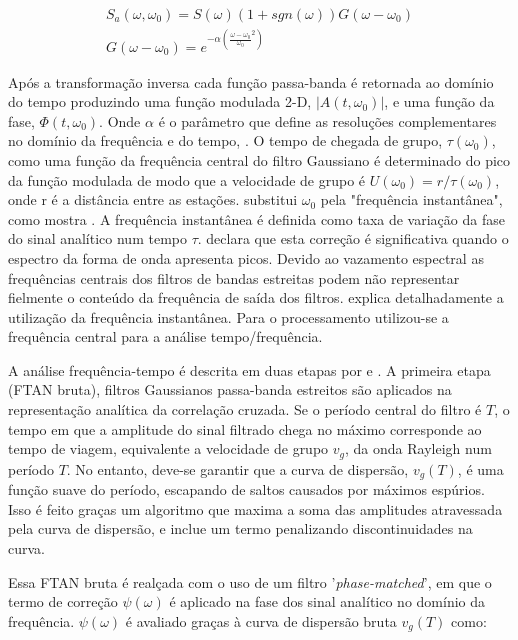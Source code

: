 \begin{eqnarray}
S_{a}(\omega,\omega _{0}) = S(\omega)(1 + sgn(\omega))G(\omega - \omega _{0})
\\
G(\omega - \omega _{0}) = e^{-\alpha(\frac{\omega - \omega _{0}}{\omega _{0}}^{2})}
\end{eqnarray}

Após a transformação inversa cada função passa-banda é retornada ao domínio do tempo produzindo uma função modulada 2-D, $\left | A(t,\omega _{0}) \right |$, e uma função da fase, $ \Phi(t,\omega _{0}) $. Onde $\alpha$ é o parâmetro que define as resoluções complementares no domínio da frequência e do tempo, \cite{levshin_automated_2001}. O tempo de chegada de grupo, $\tau (\omega _{0})$, como uma função da frequência central do filtro Gaussiano é determinado do pico da função modulada de modo que a velocidade de grupo é $U(\omega _{0})=r/\tau (\omega _{0})$, onde r é a distância entre as estações. \cite{bensen_processing_2007} substitui $\omega _{0}$ pela "frequência instantânea", como mostra \cite{bracewell_fourier_1978}. A frequência instantânea é definida como taxa de variação da fase do sinal analítico num tempo $\tau$. \cite{bensen_processing_2007} declara que esta correção é significativa quando o espectro da forma de onda apresenta picos. Devido ao vazamento espectral as frequências centrais dos filtros de bandas estreitas podem não representar fielmente o conteúdo da frequência de saída dos filtros. \cite{boashash_estimating_1992} explica detalhadamente a utilização da frequência instantânea. Para o processamento utilizou-se a frequência central para a análise tempo/frequência.

A análise frequência-tempo é descrita em duas etapas por \cite{levshin_automated_2001} e \cite{bensen_processing_2007}. A primeira etapa (FTAN bruta), filtros Gaussianos passa-banda estreitos são aplicados na representação analítica da correlação cruzada. Se o período central do filtro é $T$, o tempo em que a amplitude do sinal filtrado chega no máximo corresponde ao tempo de viagem, equivalente a velocidade de grupo $v_{g}$, da onda Rayleigh num período $T$. No entanto, deve-se garantir que a curva de dispersão, $v_{g}(T)$, é uma função suave do período, escapando de saltos causados por máximos espúrios. Isso é feito graças um algoritmo que maxima a soma das amplitudes atravessada pela curva de dispersão, e inclue um termo penalizando discontinuidades na curva.

Essa FTAN bruta é realçada com o uso de um filtro '\textit{phase-matched}', em que o termo de correção $\psi(\omega)$ é aplicado na fase dos sinal analítico no domínio da frequência. $\psi(\omega)$ é avaliado graças à curva de dispersão bruta $v_{g}(T)$ como:

